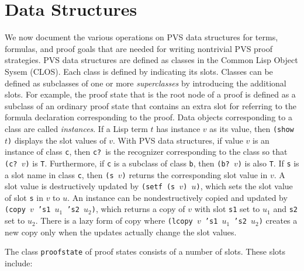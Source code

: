 \documentclass[12pt,twoside]{book}
\begin{document}
\section{Data Structures}

We now document the various operations on PVS data structures for terms,
formulas, 
and proof goals that are needed for writing nontrivial PVS proof
strategies.  PVS data structures are defined as classes in the Common Lisp
Object Sysem (CLOS).  Each class is defined by indicating its slots.
Classes can be defined as subclasses of one or more \emph{superclasses}
by introducing the additional slots.  For example, the proof state
that is the root node of a proof is defined as a subclass of an ordinary
proof state that contains an extra slot for referring to the formula
declaration corresponding to the 
proof.  Data objects corresponding to a class are called {\em
instances}\@.  If a Lisp term $t$ has instance $v$ as its value, then
\texttt{(show \(t\))} displays the slot values of $v$\@.  With PVS
data structures, if value $v$ is an instance of class \texttt{c}, then
\texttt{c?}\ is the recognizer corresponding to the class so that
\texttt{(c?~\(v\))} is \texttt{T}.  Furthermore, if \texttt{c} is a subclass of
class \texttt{b}, then \texttt{(b?~\(v\))} is also \texttt{T}\@.  If \texttt{s} is a
slot name in class \texttt{c}, then \texttt{(s \(v\))} returns the corresponding
slot value in $v$\@.    A slot value is destructively updated by
\texttt{(setf (s \(v\)) \(u\))}, which sets the slot value of slot \texttt{s}
in $v$ to $u$\@.  An instance can be nondestructively copied and updated
by \texttt{(copy \(v\) 's1 \(u_1\) 's2 \(u_2\))}, which returns a copy of
$v$ with slot \texttt{s1} set to $u_1$ and \texttt{s2} set to $u_2$\@.
There is a lazy form of copy where \texttt{(lcopy \(v\) 's1 \(u_1\) 's2
\(u_2\))}  creates a new copy only when the updates actually change
the slot values.

The class \texttt{proofstate} of proof states consists of a number of slots.
These slots include:
\end{document}
